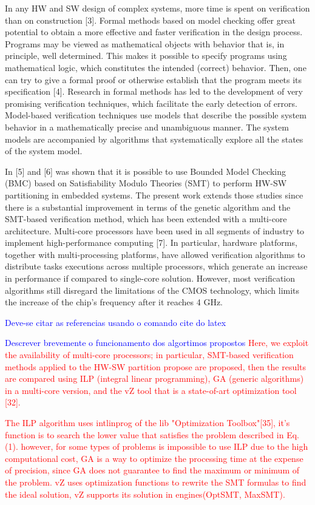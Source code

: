 In any HW and SW design of complex systems, more time is spent on verification than on construction [3]. Formal methods based on model checking offer great potential to obtain a more effective and faster verification in the design process. Programs may be viewed as mathematical objects with behavior that is, in principle, well determined. This makes it possible to specify programs using mathematical logic, which constitutes the intended (correct) behavior. Then, one can try to give a formal proof or otherwise establish that the program meets its specification [4]. Research in formal methods has led to the development of very promising verification techniques, which facilitate the early detection of errors. Model-based verification techniques use models that describe the possible system behavior in a mathematically precise and unambiguous manner. The system models are accompanied by algorithms that systematically explore all the states of the system model.

In [5] and [6] was shown that it is possible to use Bounded Model Checking (BMC) based on Satisfiability Modulo Theories (SMT) to perform HW-SW partitioning in embedded systems. The present work extends those studies since there is a substantial improvement in terms of the genetic algorithm and the SMT-based verification method, which has been extended with a multi-core architecture. Multi-core processors have been used in all segments of industry to implement high-performance computing [7]. In particular, hardware platforms, together with multi-processing platforms, have allowed verification algorithms to distribute tasks executions across multiple processors, which generate an increase in performance if compared to single-core solution. However, most verification algorithms still disregard the limitations of the CMOS technology, which limits the increase of the chip’s frequency after it reaches 4 GHz.

\textcolor{blue}{Deve-se citar as referencias usando o comando cite do latex}

\textcolor{Red}{\textcolor{blue}{Descrever brevemente o funcionamento dos algortimos propostos} Here, we exploit the availability of multi-core processors; in particular, SMT-based verification methods applied to the HW-SW partition propose are proposed, then the results are compared using ILP (integral linear programming), GA (generic algorithms) in a multi-core version, and the vZ tool that is a state-of-art optimization tool [32].} 

\textcolor{Red}{The ILP algorithm uses intlinprog of the lib "Optimization Toolbox"[35], it's function is to search the lower value that satisfies the problem described in Eq.(1). however, for some types of problems is impossible to use ILP due to the high computational cost, GA is a way to optimize the processing time at the expense of precision, since GA does not guarantee to find the maximum or minimum of the problem. vZ uses optimization functions to rewrite the SMT formulas to find the ideal solution, vZ supports its solution in engines(OptSMT, MaxSMT).}

